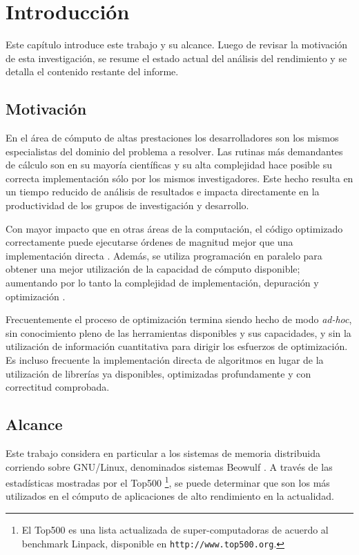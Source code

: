 \documentclass[a4paper]{report}
\begin{document}
\chapter{Introducción}

Este capítulo introduce este trabajo y su alcance. Luego de revisar la
motivación de esta investigación, se resume el estado actual del análisis
del rendimiento y se detalla el contenido restante del informe.

\section{Motivación}

En el área de cómputo de altas prestaciones los desarrolladores son los mismos
especialistas del dominio del problema a resolver. Las rutinas
más demandantes de cálculo son en su mayoría científicas y su
alta complejidad hace posible su correcta implementación sólo por los mismos investigadores.
Este hecho resulta en un tiempo reducido de análisis de resultados
e impacta directamente en la productividad de los grupos de investigación y
desarrollo.

\bigskip

Con mayor impacto que en otras áreas de la computación, el código
optimizado correctamente puede ejecutarse órdenes de magnitud mejor que una implementación
directa \cite{mm-matrixmultiplicationtool}. Además, se utiliza
programación en paralelo para obtener una mejor utilización de la
capacidad de cómputo disponible; aumentando por lo tanto la complejidad de
implementación, depuración y optimización \cite{parallel-programming}.

\bigskip

Frecuentemente el proceso de optimización termina siendo
hecho de modo {\it ad-hoc}, sin conocimiento pleno de las herramientas disponibles y
sus capacidades, y sin la utilización de información cuantitativa para dirigir los
esfuerzos de optimización. Es incluso frecuente la implementación directa
de algoritmos en lugar de la utilización de librerías ya disponibles, optimizadas
profundamente y con correctitud comprobada.

\section{Alcance}

Este trabajo considera en particular a los sistemas de memoria distribuida corriendo sobre
GNU/Linux, denominados sistemas Beowulf \cite{beowulf}. A través de las
estadísticas mostradas por el Top500 \footnote{El Top500 es una lista actualizada de super-computadoras
de acuerdo al benchmark Linpack, disponible en {\tt http://www.top500.org}.}, se
puede determinar que son los más utilizados en el cómputo de aplicaciones de alto rendimiento en la actualidad.
\end{document}
